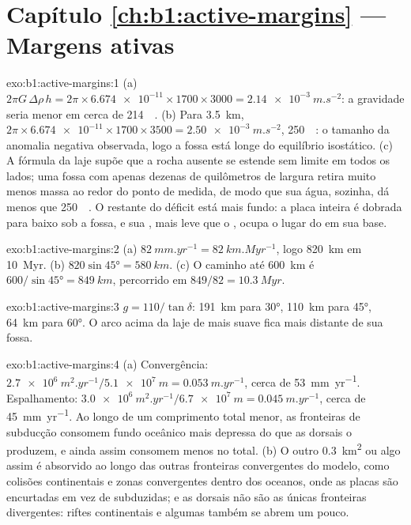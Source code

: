 \section*{Capítulo \ref{ch:b1:active-margins} --- Margens ativas}

\begin{solution}{exo:b1:active-margins:1}
(a) $2\pi G\,\Delta\rho\,h = 2\pi\times\num{6.674e-11}\times1700\times3000 =
\qty{2.14e-3}{m.s^{-2}}$: a gravidade seria menor em cerca de
\qty{214}{\milli\gal}. (b) Para \qty{3.5}{km},
$2\pi\times\num{6.674e-11}\times1700\times3500 = \qty{2.50e-3}{m.s^{-2}}$,
\qty{250}{\milli\gal}: o tamanho da anomalia negativa observada, logo a fossa está longe do equilíbrio isostático. (c) A fórmula da laje supõe que a rocha ausente se estende sem limite em todos os lados; uma fossa com apenas dezenas de quilômetros de largura retira muito menos massa ao redor do ponto de medida, de modo que sua água, sozinha, dá menos que \qty{250}{\milli\gal}. O restante do déficit está mais fundo: a placa inteira é dobrada para baixo sob a fossa, e sua , mais leve que o , ocupa o lugar do  em sua base.
\end{solution}

\begin{solution}{exo:b1:active-margins:2}
(a) $\qty{82}{mm.yr^{-1}} = \qty{82}{km.Myr^{-1}}$, logo \qty{820}{km} em
\qty{10}{Myr}. (b) $820\sin\ang{45} = \qty{580}{km}$. (c) O caminho até
\qty{600}{km} é $600/\sin\ang{45} = \qty{849}{km}$, percorrido em
$849/82 = \qty{10.3}{Myr}$.
\end{solution}

\begin{solution}{exo:b1:active-margins:3}
$g = 110/\tan\delta$: \qty{191}{km} para \ang{30}, \qty{110}{km} para \ang{45},
\qty{64}{km} para \ang{60}. O arco acima da laje de  mais suave fica mais
distante de sua fossa.
\end{solution}

\begin{solution}{exo:b1:active-margins:4}
(a) Convergência: $\qty{2.7e6}{m^2.yr^{-1}}/\qty{5.1e7}{m} =
\qty{0.053}{m.yr^{-1}}$, cerca de \qty{53}{mm.yr^{-1}}. Espalhamento:
$\qty{3.0e6}{m^2.yr^{-1}}/\qty{6.7e7}{m} = \qty{0.045}{m.yr^{-1}}$, cerca de
\qty{45}{mm.yr^{-1}}. Ao longo de um comprimento total menor, as fronteiras de subducção consomem fundo oceânico mais depressa do que as dorsais o produzem, e ainda assim consomem menos no total.
(b) O outro \qty{0.3}{km^2} ou algo assim é absorvido ao longo das outras fronteiras convergentes do modelo, como colisões continentais e zonas convergentes dentro dos oceanos, onde as placas são encurtadas em vez de subduzidas; e as dorsais não são as únicas fronteiras divergentes: riftes continentais e algumas  também se abrem um pouco.
\end{solution}

